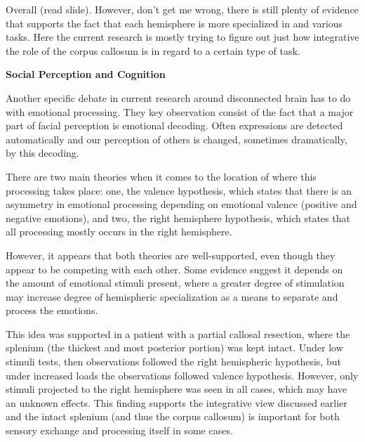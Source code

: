 \documentclass[basic]{inVerba-notes}
\begin{document}
Overall (read slide). However, don't get me wrong, there is still plenty of evidence that supports the fact that each hemisphere is more specialized in and various tasks. Here the current research is mostly trying to figure out just how integrative the role of the corpus callosum is in regard to a certain type of task.

\textbf{Social Perception and Cognition}

Another specific debate in current research around disconnected brain has to do with emotional processing. They key observation consist of the fact that a major part of facial perception is emotional decoding. Often expressions are detected automatically and our perception of others is changed, sometimes dramatically, by this decoding. 

There are two main theories when it comes to the location of where this processing takes place: one, the valence hypothesis, which states that there is an asymmetry in emotional processing depending on emotional valence (positive and negative emotions), and two, the right hemisphere hypothesis, which states that all processing mostly occurs in the right hemisphere.

However, it appears that both theories are well-supported, even though they appear to be competing with each other. Some evidence suggest it depends on the amount of emotional stimuli present, where a greater degree of stimulation may increase degree of hemispheric specialization as a means to separate and process the emotions. 

This idea was supported in a patient with a partial callosal resection, where the splenium (the thickest and most posterior portion) was kept intact. Under low stimuli tests, then observations followed the right hemispheric hypothesis, but under increased loads the observations followed valence hypothesis. However, only stimuli projected to the right hemisphere was seen in all cases, which may have an unknown effects. This finding supports the integrative view discussed earlier and the intact splenium (and thus the corpus callosum) is important for both sensory exchange and processing itself in some cases.
\end{document}
